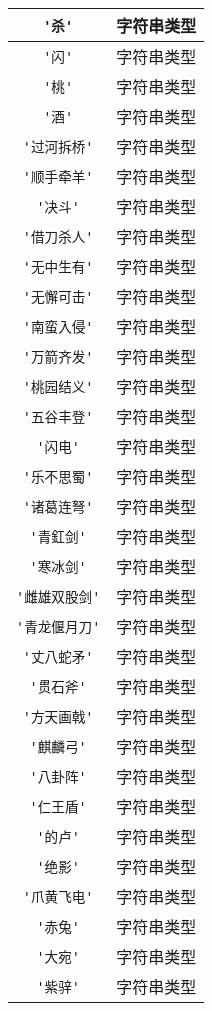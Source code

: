 \begin{center}
\begin{longtable}{|c|c|}
\hline \verb|'杀'| & 字符串类型 \\
\hline \verb|'闪'| & 字符串类型 \\
\hline \verb|'桃'| & 字符串类型 \\
\hline \verb|'酒'| & 字符串类型 \\
\hline \verb|'过河拆桥'| & 字符串类型 \\
\hline \verb|'顺手牵羊'| & 字符串类型 \\
\hline \verb|'决斗'| & 字符串类型 \\
\hline \verb|'借刀杀人'| & 字符串类型 \\
\hline \verb|'无中生有'| & 字符串类型 \\
\hline \verb|'无懈可击'| & 字符串类型 \\
\hline \verb|'南蛮入侵'| & 字符串类型 \\
\hline \verb|'万箭齐发'| & 字符串类型 \\
\hline \verb|'桃园结义'| & 字符串类型 \\
\hline \verb|'五谷丰登'| & 字符串类型 \\
\hline \verb|'闪电'| & 字符串类型 \\
\hline \verb|'乐不思蜀'| & 字符串类型 \\
\hline \verb|'诸葛连弩'| & 字符串类型 \\
\hline \verb|'青釭剑'| & 字符串类型 \\
\hline \verb|'寒冰剑'| & 字符串类型 \\
\hline \verb|'雌雄双股剑'| & 字符串类型 \\
\hline \verb|'青龙偃月刀'| & 字符串类型 \\
\hline \verb|'丈八蛇矛'| & 字符串类型 \\
\hline \verb|'贯石斧'| & 字符串类型 \\
\hline \verb|'方天画戟'| & 字符串类型 \\
\hline \verb|'麒麟弓'| & 字符串类型 \\
\hline \verb|'八卦阵'| & 字符串类型 \\
\hline \verb|'仁王盾'| & 字符串类型 \\
\hline \verb|'的卢'| & 字符串类型 \\
\hline \verb|'绝影'| & 字符串类型 \\
\hline \verb|'爪黄飞电'| & 字符串类型 \\
\hline \verb|'赤兔'| & 字符串类型 \\
\hline \verb|'大宛'| & 字符串类型 \\
\hline \verb|'紫骍'| & 字符串类型 \\

\end{longtable}
\end{center}
